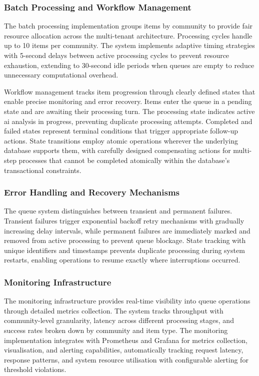 \subsubsection{Batch Processing and Workflow Management}

The batch processing implementation groups items by community to provide fair resource allocation across the multi-tenant architecture. Processing cycles handle up to 10 items per community. The system implements adaptive timing strategies with 5-second delays between active processing cycles to prevent resource exhaustion, extending to 30-second idle periods when queues are empty to reduce unnecessary computational overhead.

Workflow management tracks item progression through clearly defined states that enable precise monitoring and error recovery. Items enter the queue in a pending state and are awaiting their processing turn. The processing state indicates active \ac{ai} analysis in progress, preventing duplicate processing attempts. Completed and failed states represent terminal conditions that trigger appropriate follow-up actions. State transitions employ atomic operations wherever the underlying database supports them, with carefully designed compensating actions for multi-step processes that cannot be completed atomically within the database's transactional constraints.

\subsubsection{Error Handling and Recovery Mechanisms}

The queue system distinguishes between transient and permanent failures. Transient failures trigger exponential backoff retry mechanisms with gradually increasing delay intervals, while permanent failures are immediately marked and removed from active processing to prevent queue blockage. State tracking with unique identifiers and timestamps prevents duplicate processing during system restarts, enabling operations to resume exactly where interruptions occurred.

\subsubsection{Monitoring Infrastructure}

The monitoring infrastructure provides real-time visibility into queue operations through detailed metrics collection. The system tracks throughput with community-level granularity, latency across different processing stages, and success rates broken down by community and item type. The monitoring implementation integrates with Prometheus and Grafana for metrics collection, visualisation, and alerting capabilities, automatically tracking request latency, response patterns, and system resource utilisation with configurable alerting for threshold violations.

